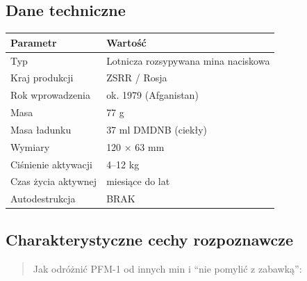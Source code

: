 \documentclass[12pt,oneside]{book}
\begin{document}
\subsection{Dane techniczne}\label{dane-techniczne-126}

\begin{longtable}[]{@{}ll@{}}
\toprule\noalign{}
Parametr & Wartość \\
\midrule\noalign{}
\endhead
\bottomrule\noalign{}
\endlastfoot
Typ & Lotnicza rozsypywana mina naciskowa \\
Kraj produkcji & ZSRR / Rosja \\
Rok wprowadzenia & ok. 1979 (Afganistan) \\
Masa & 77 g \\
Masa ładunku & 37 ml DMDNB (ciekły) \\
Wymiary & 120 × 63 mm \\
Ciśnienie aktywacji & 4--12 kg \\
Czas życia aktywnej & miesiące do lat \\
Autodestrukcja & BRAK \\
\end{longtable}

\subsection{Charakterystyczne cechy
rozpoznawcze}\label{charakterystyczne-cechy-rozpoznawcze-126}

\begin{quote}
Jak odróżnić PFM-1 od innych min i ``nie pomylić z zabawką'':
\end{quote}
\end{document}
